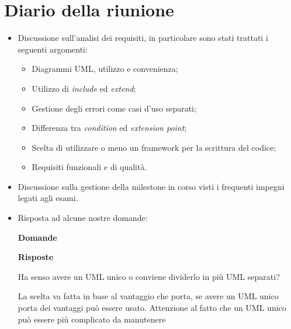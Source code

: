 \section{Diario della riunione}
\begin{itemize}
  \item Discussione sull'analisi dei requisiti, in particolare sono stati trattati i seguenti argomenti:
  \begin{itemize}
    \item Diagrammi UML, utilizzo e convenienza;
    \item Utilizzo di \textit{include} ed \textit{extend};
    \item Gestione degli errori come casi d'uso separati;
    \item Differenza tra \textit{condition} ed \textit{extension point};
    \item Scelta di utilizzare o meno un framework per la scrittura del codice;
    \item Requisiti funzionali e di qualità.
  \end{itemize}
  \item Discussione sulla gestione della milestone in corso visti i frequenti impegni legati agli esami.
  \item Risposta ad alcune nostre domande:

  \begin{spacing}{2}
  \end{spacing}

  \begin{minipage}[b]{0.47\textwidth}
    \centering
    \textbf{Domande}
  \end{minipage}
  \hfill
  \begin{minipage}[b]{0.47\textwidth}
    \centering
    \textbf{Risposte}
  \end{minipage}

  \begin{spacing}{3}
  \end{spacing}

  \begin{minipage}[c]{0.47\textwidth}
    \centering
    Ha senso avere un UML unico o conviene dividerlo in più UML separati?
  \end{minipage}
  \hfill
  \begin{minipage}[c]{0.47\textwidth}
    \centering
    La scelta va fatta in base al vantaggio che porta, se avere un UML unico porta dei vantaggi può essere usato. Attenzione al fatto che un UML unico può essere più complicato da manutenere
  \end{minipage}


\end{itemize}
